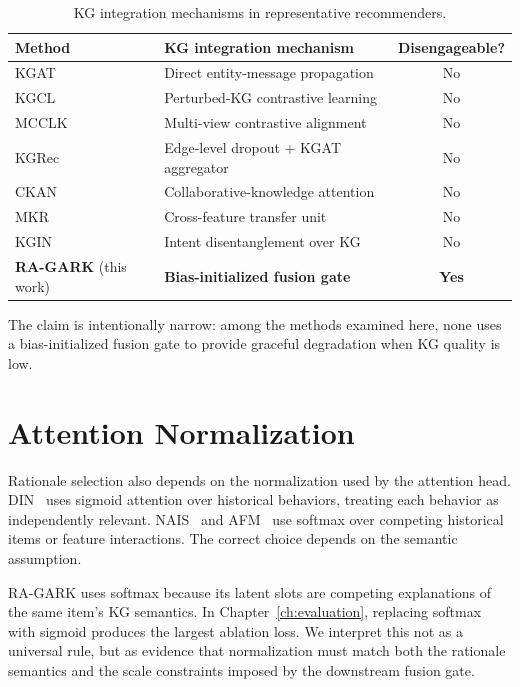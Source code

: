 \begin{table}[!htbp]
\centering
\caption{KG integration mechanisms in representative recommenders.}
\label{tab:rw-gating-gap}
\begin{tabular}{l l c}
\toprule
Method & KG integration mechanism & Disengageable? \\
\midrule
KGAT~\cite{wang2019kgat}      & Direct entity-message propagation        & No \\
KGCL~\cite{yang2022kgcl}      & Perturbed-KG contrastive learning        & No \\
MCCLK~\cite{zou2022mcclk}     & Multi-view contrastive alignment         & No \\
KGRec~\cite{yang2023kgrec}    & Edge-level dropout + KGAT aggregator     & No \\
CKAN~\cite{wang2020ckan}      & Collaborative-knowledge attention        & No \\
MKR~\cite{wang2019mkr}        & Cross-feature transfer unit              & No \\
KGIN~\cite{wang2021kgin}      & Intent disentanglement over KG           & No \\
\midrule
\textbf{RA-GARK} (this work)  & \textbf{Bias-initialized fusion gate}    & \textbf{Yes} \\
\bottomrule
\end{tabular}
\end{table}
\FloatBarrier

The claim is intentionally narrow: among the methods examined here, none uses a bias-initialized fusion gate to provide graceful degradation when KG quality is low.

\section{Attention Normalization}
\label{sec:rw-attention-norm}

Rationale selection also depends on the normalization used by the attention head. DIN~\cite{zhou2018din} uses sigmoid attention over historical behaviors, treating each behavior as independently relevant. NAIS~\cite{he2018nais} and AFM~\cite{xiao2017afm} use softmax over competing historical items or feature interactions. The correct choice depends on the semantic assumption.

RA-GARK uses softmax because its latent slots are competing explanations of the same item's KG semantics. In Chapter~\ref{ch:evaluation}, replacing softmax with sigmoid produces the largest ablation loss. We interpret this not as a universal rule, but as evidence that normalization must match both the rationale semantics and the scale constraints imposed by the downstream fusion gate.

